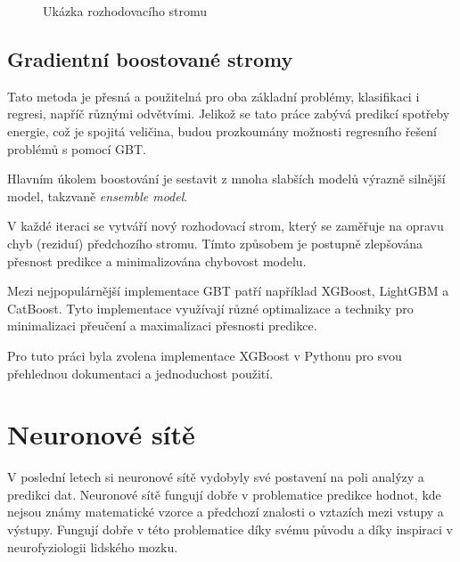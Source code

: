 \documentclass[FM,BP,fonts]{tulthesis}
\begin{document}
\begin{figure}[htbp]
	\centering
	\caption{Ukázka rozhodovacího stromu}
	\label{fig:my_graph}
\end{figure}
\subsection{Gradientní boostované stromy}\label{xgboost_research}
Tato metoda je přesná a použitelná pro oba základní problémy, klasifikaci i regresi, napříč různými odvětvími. Jelikož se tato práce zabývá predikcí spotřeby energie, což je spojitá veličina, budou prozkoumány možnosti regresního řešení problémů s pomocí GBT.

Hlavním úkolem boostování je sestavit z mnoha slabších modelů výrazně silnější model, takzvaně \textit{ensemble  model}. \cite{chen2016xgboost}

V každé iteraci se vytváří nový rozhodovací strom, který se zaměřuje na opravu chyb (reziduí) předchozího stromu. Tímto způsobem je postupně zlepšována přesnost predikce a minimalizována chybovost modelu. 

Mezi nejpopulárnější implementace GBT patří například XGBoost, LightGBM a CatBoost. Tyto implementace využívají různé optimalizace a techniky pro minimalizaci přeučení a maximalizaci přesnosti predikce.

Pro tuto práci byla zvolena implementace XGBoost v Pythonu pro svou přehlednou dokumentaci a jednoduchost použití.


\section{Neuronové sítě}
V poslední letech si neuronové sítě vydobyly své postavení na poli analýzy a predikci dat. Neuronové sítě fungují dobře v problematice predikce hodnot, kde nejsou známy matematické vzorce a předchozí znalosti o vztazích mezi vstupy a výstupy. Fungují dobře v této problematice díky svému původu a díky inspiraci v neurofyziologii lidského mozku.
\end{document}

